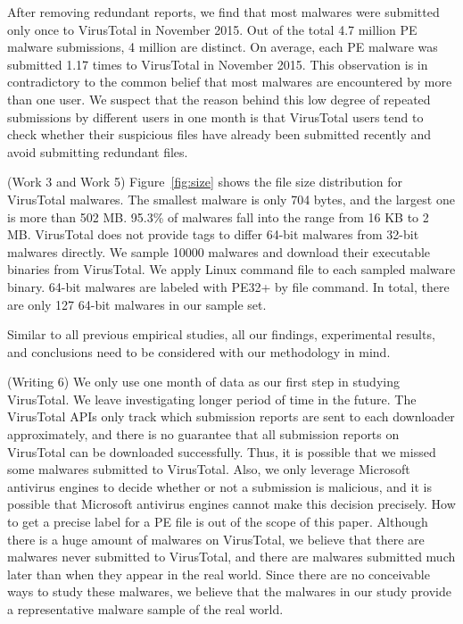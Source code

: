 After removing redundant reports, we find that most malwares were submitted only once to VirusTotal in November 2015. 
Out of the total 4.7 million PE malware submissions, 4 million are distinct. 
On average, each PE malware was submitted 1.17 times to VirusTotal in November 2015. 
This observation is in contradictory to the common belief that most malwares are encountered by more than one user.
We suspect that the reason behind this low degree of repeated submissions by different users in one month
is that VirusTotal users
tend to check whether their suspicious files have already been submitted recently
and avoid submitting redundant files.

{\color{red} (Work 3 and Work 5)
Figure~\ref{fig:size} shows the file size distribution for VirusTotal malwares. 
The smallest malware is only 704 bytes, and the largest one is more than 502 MB. 
95.3\% of malwares fall into the range from 16 KB to 2 MB. 
VirusTotal does not provide tags to differ 64-bit malwares from 32-bit malwares directly. 
We sample 10000 malwares and download their executable binaries from VirusTotal.
We apply Linux command file to each sampled malware binary. 
64-bit malwares are labeled with PE32+ by file command. 
In total, there are only 127 64-bit malwares in our sample set. 
}

Similar to all previous empirical studies, all our findings, experimental results, 
and conclusions need to be considered with our methodology in mind. 

{\color{red} (Writing 6)
We only use one month of data as our first step in studying VirusTotal. 
We leave investigating longer period of time in the future. 
}
The VirusTotal APIs only track which submission reports are sent to each downloader approximately, 
and there is no guarantee that all submission reports on VirusTotal can be downloaded successfully. 
Thus, it is possible that we missed some malwares submitted to VirusTotal. 
Also, we only leverage Microsoft antivirus engines to decide whether or not a submission is malicious, 
and it is possible that Microsoft antivirus engines cannot make this decision precisely. 
How to get a precise label for a PE file is out of the scope of this paper.  
Although there is a huge amount of malwares on VirusTotal, we believe that there are malwares never submitted to VirusTotal, 
and there are malwares submitted much later than when they appear in the real world.
Since there are no conceivable ways to study these malwares,
we believe that the malwares in our study provide a representative malware sample of the real world. 



